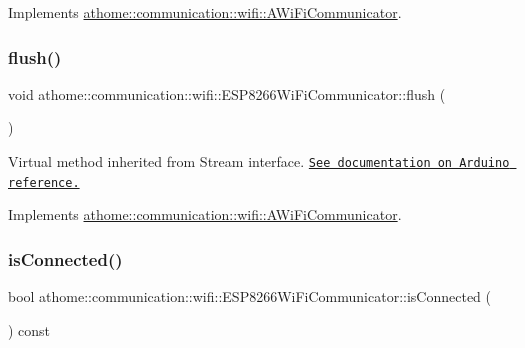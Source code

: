 Implements \mbox{\hyperlink{classathome_1_1communication_1_1wifi_1_1_a_wi_fi_communicator_aebcf385c3e0382eda7c99760f100901c}{athome\+::communication\+::wifi\+::\+A\+Wi\+Fi\+Communicator}}.

\mbox{\label{classathome_1_1communication_1_1wifi_1_1_e_s_p8266_wi_fi_communicator_af95ca7f47285b13fc895e0d9323ee320}} 
\subsubsection{\texorpdfstring{flush()}{flush()}}
{\footnotesize\ttfamily void athome\+::communication\+::wifi\+::\+E\+S\+P8266\+Wi\+Fi\+Communicator\+::flush (\begin{DoxyParamCaption}{ }\end{DoxyParamCaption})\hspace{0.3cm}{\ttfamily [virtual]}}

Virtual method inherited from Stream interface. \href{https://www.arduino.cc/reference/en/language/functions/communication/stream/streamflush/}{\tt See documentation on Arduino reference.} 

Implements \mbox{\hyperlink{classathome_1_1communication_1_1wifi_1_1_a_wi_fi_communicator_aa974255c8bdbae19d3d4bd0f1a50318f}{athome\+::communication\+::wifi\+::\+A\+Wi\+Fi\+Communicator}}.

\mbox{\label{classathome_1_1communication_1_1wifi_1_1_e_s_p8266_wi_fi_communicator_aefadac9b1a67d52853495dfabecad5fd}} 
\subsubsection{\texorpdfstring{is\+Connected()}{isConnected()}}
{\footnotesize\ttfamily bool athome\+::communication\+::wifi\+::\+E\+S\+P8266\+Wi\+Fi\+Communicator\+::is\+Connected (\begin{DoxyParamCaption}{ }\end{DoxyParamCaption}) const\hspace{0.3cm}{\ttfamily [virtual]}}

